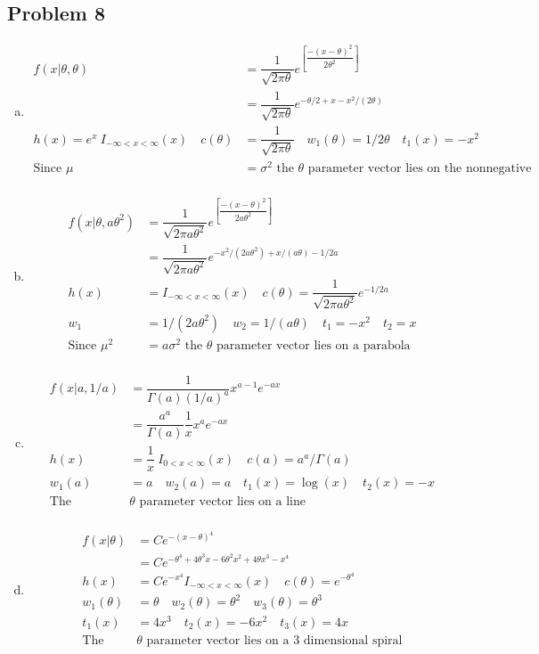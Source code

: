 \documentclass{article}
\begin{document}
\begin{flushleft}
\section*{Problem 8}
\begin{enumerate}[(a)]
\item 
\begin{align*}
f(x|\theta,\theta)&=\dfrac{1}{\sqrt{2\pi\theta}}e^{\left[\dfrac{-(x-\theta)^2}{2\theta^2}\right]}\\
&=\dfrac{1}{\sqrt{2\pi\theta}}e^{-\theta/2+x-x^2/(2\theta)}\\
h(x)=e^x \ I_{-\infty<x<\infty}(x) \quad c(\theta)&=\dfrac{1}{\sqrt{2\pi\theta}} \quad w_1(\theta)=1/2\theta \quad t_1(x)=-x^2\\
\text{Since } \mu&=\sigma^2 \text{ the } \theta \text{ parameter vector lies on the nonnegative real line} \\
\end{align*}
\item 
\begin{align*}
f(x|\theta,a\theta^2)&=\dfrac{1}{\sqrt{2\pi a\theta^2}}e^{\left[\dfrac{-(x-\theta)^2}{2a\theta^2}\right]}\\
&=\dfrac{1}{\sqrt{2\pi a\theta^2}}e^{-x^2/(2a\theta^2)+x/(a\theta)-1/2a}\\
h(x)&=I_{-\infty<x<\infty}(x) \quad c(\theta)=\dfrac{1}{\sqrt{2\pi a\theta^2}}e^{-1/2a}\\
w_1&=1/(2a\theta^2)  \quad w_2=1/(a\theta) \quad t_1=-x^2 \quad t_2=x\\
\text{Since } \mu^2&=a\sigma^2 \text{ the } \theta \text{ parameter vector lies on a parabola}\\
\end{align*}
\item 
\begin{align*}
f(x|a,1/a)&=\dfrac{1}{\Gamma(a)(1/a)^a}x^{a-1}e^{-ax}\\
&=\dfrac{a^a}{\Gamma(a)}\dfrac{1 }{x}x^{a}e^{-ax}\\
h(x)&= \dfrac{1}{x} \ I_{0<x<\infty}(x) \quad c(a)=a^a/\Gamma(a)\\
w_1(a)&=a \quad w_2(a)=a \quad t_1(x)=\log(x) \quad t_2(x)=-x\\
\text{The } &\theta \text{ parameter vector lies on a line}\\
\end{align*}
\item 
\begin{align*}
f(x|\theta)&=Ce^{-(x-\theta)^4}\\
&=Ce^{-\theta^4+4\theta^3x-6\theta^2x^2+4\theta x^3-x^4}\\
h(x)&=Ce^{-x^4}I_{-\infty<x<\infty}(x) \quad c(\theta)=e^{-\theta^4}\\
w_1(\theta)&=\theta \quad w_2(\theta)=\theta^2 \quad w_3(\theta)=\theta^3\\
t_1(x)&=4x^3 \quad t_2(x)=-6x^2 \quad t_3(x)=4x\\
\text{The } &\theta \text{ parameter vector lies on a 3 dimensional spiral}\\
\end{align*}
\end{enumerate}

\end{flushleft}
\end{document}
